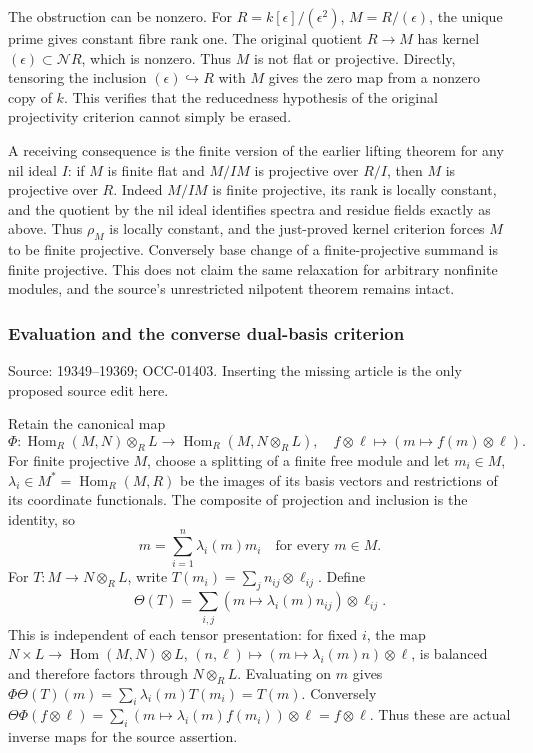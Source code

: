 The obstruction can be nonzero. For \(R=k[\epsilon]/(\epsilon^2)\), \(M=R/(\epsilon)\), the unique prime gives constant fibre rank one. The original quotient \(R\to M\) has kernel \((\epsilon)\subset\mathcal NR\), which is nonzero. Thus \(M\) is not flat or projective. Directly, tensoring the inclusion \((\epsilon)\hookrightarrow R\) with \(M\) gives the zero map from a nonzero copy of \(k\). This verifies that the reducedness hypothesis of the original projectivity criterion cannot simply be erased.

A receiving consequence is the finite version of the earlier lifting theorem for any nil ideal \(I\): if \(M\) is finite flat and \(M/IM\) is projective over \(R/I\), then \(M\) is projective over \(R\). Indeed \(M/IM\) is finite projective, its rank is locally constant, and the quotient by the nil ideal identifies spectra and residue fields exactly as above. Thus \(\rho_M\) is locally constant, and the just-proved kernel criterion forces \(M\) to be finite projective. Conversely base change of a finite-projective summand is finite projective. This does not claim the same relaxation for arbitrary nonfinite modules, and the source's unrestricted nilpotent theorem remains intact.

\subsubsection{Evaluation and the converse dual-basis criterion}\label{algebra-proof-009-evaluation-and-the-converse-dual-basis-criterion}

Source: 19349--19369; OCC-01403. Inserting the missing article is the only proposed source edit here.

Retain the canonical map \[
\Phi:\operatorname{Hom}_R(M,N)\otimes_RL\longrightarrow
\operatorname{Hom}_R(M,N\otimes_RL),
\quad f\otimes\ell\longmapsto(m\mapsto f(m)\otimes\ell).
\] For finite projective \(M\), choose a splitting of a finite free module and let \(m_i\in M\), \(\lambda_i\in M^*=\operatorname{Hom}_R(M,R)\) be the images of its basis vectors and restrictions of its coordinate functionals. The composite of projection and inclusion is the identity, so \[
m=\sum_{i=1}^n\lambda_i(m)m_i\quad\text{for every }m\in M.
\] For \(T:M\to N\otimes_RL\), write \(T(m_i)=\sum_j n_{ij}\otimes\ell_{ij}\). Define \[
\Theta(T)=\sum_{i,j}(m\mapsto\lambda_i(m)n_{ij})\otimes\ell_{ij}.
\] This is independent of each tensor presentation: for fixed \(i\), the map \(N\times L\to\operatorname{Hom}(M,N)\otimes L\), \((n,\ell)\mapsto(m\mapsto\lambda_i(m)n)\otimes\ell\), is balanced and therefore factors through \(N\otimes_RL\). Evaluating on \(m\) gives \(\Phi\Theta(T)(m)=\sum_i\lambda_i(m)T(m_i)=T(m)\). Conversely \(\Theta\Phi(f\otimes\ell)=\sum_i(m\mapsto\lambda_i(m)f(m_i))\otimes\ell=f\otimes\ell\). Thus these are actual inverse maps for the source assertion.

